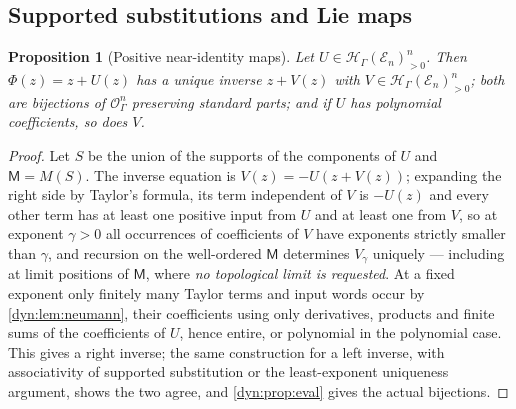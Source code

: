 \documentclass[11pt,letterpaper]{article}
\newtheorem{proposition}[proposition]{Proposition}
\theoremstyle{definition}
\theoremstyle{remark}
\newcommand{\HH}{\mathscr H}
\newcommand{\OO}{\mathcal O}
\newcommand{\EE}{\mathscr E}
\numberwithin{equation}{section}
\begin{document}
\subsection{Supported substitutions and Lie maps}

\begin{proposition}[Positive near-identity maps]\label{dyn:prop:inverse}
Let $U\in\HH_\Gamma(\EE_n)_{>0}^{n}$. Then $\Phi(z)=z+U(z)$ has a unique
inverse $z+V(z)$ with $V\in\HH_\Gamma(\EE_n)_{>0}^{n}$; both are bijections
of $\OO_\Gamma^{n}$ preserving standard parts; and if $U$ has polynomial
coefficients, so does $V$.
\end{proposition}
\begin{proof}
Let $S$ be the union of the supports of the components of $U$ and
$\mathsf M=M(S)$. The inverse equation is $V(z)=-U(z+V(z))$; expanding the
right side by Taylor's formula, its term independent of $V$ is $-U(z)$ and
every other term has at least one positive input from $U$ and at least one
from $V$, so at exponent $\gamma>0$ all occurrences of coefficients of $V$
have exponents strictly smaller than $\gamma$, and recursion on the
well-ordered $\mathsf M$ determines $V_\gamma$ uniquely --- including at
limit positions of $\mathsf M$, where \emph{no topological limit is
requested}. At a fixed exponent only finitely many Taylor terms and input
words occur by \cref{dyn:lem:neumann}, their coefficients using only
derivatives, products and finite sums of the coefficients of $U$, hence
entire, or polynomial in the polynomial case. This gives a right inverse;
the same construction for a left inverse, with associativity of supported
substitution or the least-exponent uniqueness argument, shows the two
agree, and \cref{dyn:prop:eval} gives the actual bijections.
\end{proof}
\end{document}
